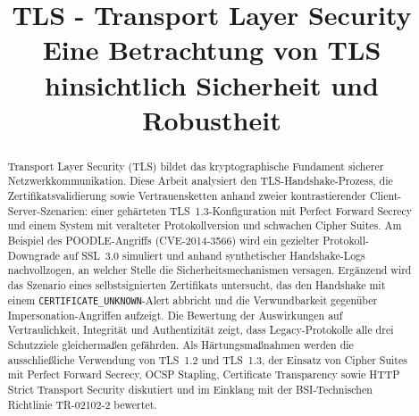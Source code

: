 \documentclass[conference]{IEEEtran}
\begin{document}
\title{TLS - Transport Layer Security\\
{\footnotesize Eine Betrachtung von TLS hinsichtlich Sicherheit und Robustheit }
}

\author{
\and
{}
\and
{}
\and
{}
}

\maketitle

\begin{abstract}

Transport Layer Security (TLS) bildet das kryptographische Fundament sicherer Netzwerkkommunikation. Diese Arbeit analysiert den TLS-Handshake-Prozess, die Zertifikatsvalidierung sowie Vertrauensketten anhand zweier kontrastierender Client-Server-Szenarien: einer gehärteten TLS~1.3-Konfiguration mit Perfect Forward Secrecy und einem System mit veralteter Protokollversion und schwachen Cipher Suites. Am Beispiel des POODLE-Angriffs (CVE-2014-3566) wird ein gezielter Protokoll-Downgrade auf SSL~3.0 simuliert und anhand synthetischer Handshake-Logs nachvollzogen, an welcher Stelle die Sicherheitsmechanismen versagen. Ergänzend wird das Szenario eines selbstsignierten Zertifikats untersucht, das den Handshake mit einem \texttt{CERTIFICATE\_UNKNOWN}-Alert abbricht und die Verwundbarkeit gegenüber Impersonation-Angriffen aufzeigt. Die Bewertung der Auswirkungen auf Vertraulichkeit, Integrität und Authentizität zeigt, dass Legacy-Protokolle alle drei Schutzziele gleichermaßen gefährden. Als Härtungsmaßnahmen werden die ausschließliche Verwendung von TLS~1.2 und TLS~1.3, der Einsatz von Cipher Suites mit Perfect Forward Secrecy, OCSP Stapling, Certificate Transparency sowie HTTP Strict Transport Security diskutiert und im Einklang mit der BSI-Technischen Richtlinie TR-02102-2 bewertet.

\end{abstract}
\end{document}

